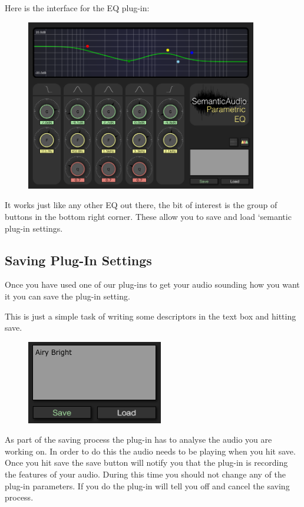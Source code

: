 \documentclass[a4paper]{article}
\begin{document}
	Here is the interface for the EQ plug-in:

	\begin{figure}[h!]
		\centering
		\includegraphics[width=0.9\textwidth]{Images/EQ.png}
	\end{figure}
	
	It works just like any other EQ out there, the bit of interest is the group of buttons in the bottom right corner. These allow you to save and load `semantic plug-in settings.
	
	\newpage
	\subsection*{Saving Plug-In Settings}
		Once you have used one of our plug-ins to get your audio sounding how you want it you can save the plug-in setting.

		This is just a simple task of writing some descriptors in the text box and hitting save.

		\begin{figure}[h!]
			\centering
			\includegraphics[scale=1]{Images/Saving.png}
		\end{figure}

		As part of the saving process the plug-in has to analyse the audio you are working on. In order to do this the audio needs to be playing when you hit save. Once you hit save the save button will notify you that the plug-in is recording the features of your audio. During this time you should not change any of the plug-in parameters. If you do the plug-in will tell you off and cancel the saving process.
\end{document}
